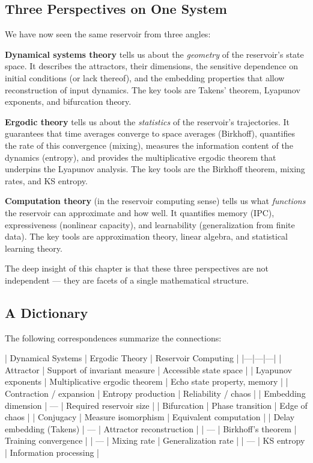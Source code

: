 \subsection{Three Perspectives on One System}\label{sec:16.7.1}

We have now seen the same reservoir from three angles:

\textbf{Dynamical systems theory} tells us about the \textit{geometry} of the reservoir's state space. It describes the attractors, their dimensions, the sensitive dependence on initial conditions (or lack thereof), and the embedding properties that allow reconstruction of input dynamics. The key tools are Takens' theorem, Lyapunov exponents, and bifurcation theory.

\textbf{Ergodic theory} tells us about the \textit{statistics} of the reservoir's trajectories. It guarantees that time averages converge to space averages (Birkhoff), quantifies the rate of this convergence (mixing), measures the information content of the dynamics (entropy), and provides the multiplicative ergodic theorem that underpins the Lyapunov analysis. The key tools are the Birkhoff theorem, mixing rates, and KS entropy.

\textbf{Computation theory} (in the reservoir computing sense) tells us what \textit{functions} the reservoir can approximate and how well. It quantifies memory (IPC), expressiveness (nonlinear capacity), and learnability (generalization from finite data). The key tools are approximation theory, linear algebra, and statistical learning theory.

The deep insight of this chapter is that these three perspectives are not independent --- they are facets of a single mathematical structure.

\subsection{A Dictionary}\label{sec:16.7.2}

The following correspondences summarize the connections:

| Dynamical Systems | Ergodic Theory | Reservoir Computing |
|---|---|---|
| Attractor | Support of invariant measure | Accessible state space |
| Lyapunov exponents | Multiplicative ergodic theorem | Echo state property, memory |
| Contraction / expansion | Entropy production | Reliability / chaos |
| Embedding dimension | --- | Required reservoir size |
| Bifurcation | Phase transition | Edge of chaos |
| Conjugacy | Measure isomorphism | Equivalent computation |
| Delay embedding (Takens) | --- | Attractor reconstruction |
| --- | Birkhoff's theorem | Training convergence |
| --- | Mixing rate | Generalization rate |
| --- | KS entropy | Information processing |

